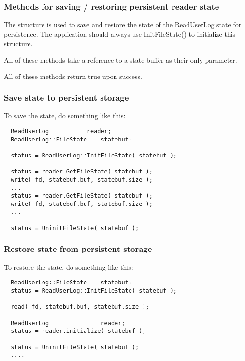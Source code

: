 \subsubsection{Methods for saving / restoring persistent reader state}

The  structure is used to save and
restore the state of the ReadUserLog state for persistence.  The
application should always use InitFileState() to initialize this
structure.

All of these methods take a reference to a state buffer
as their only parameter.

All of these methods return true upon success.

\subsubsection{Save state to persistent storage}
To save the state, do something like this:
\begin{verbatim}
  ReadUserLog			reader;
  ReadUserLog::FileState	statebuf;

  status = ReadUserLog::InitFileState( statebuf );

  status = reader.GetFileState( statebuf );
  write( fd, statebuf.buf, statebuf.size );
  ...
  status = reader.GetFileState( statebuf );
  write( fd, statebuf.buf, statebuf.size );
  ...

  status = UninitFileState( statebuf );
\end{verbatim}

\subsubsection{Restore state from persistent storage}
To restore the state, do something like this:
\begin{verbatim}
  ReadUserLog::FileState	statebuf;
  status = ReadUserLog::InitFileState( statebuf );

  read( fd, statebuf.buf, statebuf.size );

  ReadUserLog  				reader;
  status = reader.initialize( statebuf );

  status = UninitFileState( statebuf );
  ....
\end{verbatim}

